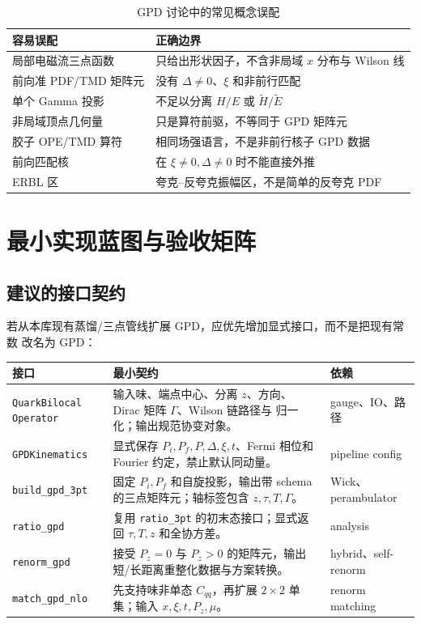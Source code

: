 \documentclass[12pt,a4paper]{ctexart}
\theoremstyle{definition}
\begin{document}
\begin{table}[H]
\centering
\small
\caption{GPD 讨论中的常见概念误配}
\label{tab:gpd-concept-risks}
\begin{tabularx}{\textwidth}{p{4cm}X}
\toprule
容易误配 & 正确边界 \\
\midrule
局部电磁流三点函数 & 只给出形状因子，不含非局域 $x$ 分布与 Wilson 线 \\
前向准 PDF/TMD 矩阵元 & 没有 $\Delta\ne0$、$\xi$ 和非前行匹配 \\
单个 Gamma 投影 & 不足以分离 $H/E$ 或 $\widetilde H/\widetilde E$ \\
非局域顶点几何量 & 只是算符前驱，不等同于 GPD 矩阵元 \\
胶子 OPE/TMD 算符 & 相同场强语言，不是非前行核子 GPD 数据 \\
前向匹配核 & 在 $\xi\ne0,\Delta\ne0$ 时不能直接外推 \\
ERBL 区 & 夸克--反夸克振幅区，不是简单的反夸克 PDF \\
\bottomrule
\end{tabularx}
\end{table}

\section{最小实现蓝图与验收矩阵}

\subsection{建议的接口契约}

若从本库现有蒸馏/三点管线扩展 GPD，应优先增加显式接口，而不是把现有常数
改名为 GPD：

\begin{xltabular}{\textwidth}{p{4.2cm}Xp{3.2cm}}
\toprule
接口 & 最小契约 & 依赖 \\
\midrule
\endhead
\texttt{QuarkBilocal}\newline
\texttt{Operator} &
输入味、端点中心、分离 $z$、方向、Dirac 矩阵 $\Gamma$、Wilson 链路径与
归一化；输出规范协变对象。 &
gauge、IO、路径 \\
\texttt{GPDKinematics} &
显式保存 $P_i,P_f,P,\Delta,\xi,t$、Fermi 相位和 Fourier 约定，禁止默认同动量。 &
pipeline config \\
\texttt{build\_gpd\_3pt} &
固定 $P_i,P_f$ 和自旋投影，输出带 schema 的三点矩阵元；轴标签包含
$z,\tau,T,\Gamma$。 &
Wick、perambulator \\
\texttt{ratio\_gpd} &
复用 \texttt{ratio\_3pt} 的初末态接口；显式返回 $\tau,T,z$ 和全协方差。 &
analysis \\
\texttt{renorm\_gpd} &
接受 $P_z=0$ 与 $P_z>0$ 的矩阵元，输出短/长距离重整化数据与方案转换。 &
hybrid、self-renorm \\
\texttt{match\_gpd\_nlo} &
先支持味非单态 $C_{qq}$，再扩展 $2\times2$ 单集；输入 $x,\xi,t,P_z,\mu$。 &
renorm matching \\
\bottomrule
\end{xltabular}
\end{document}
